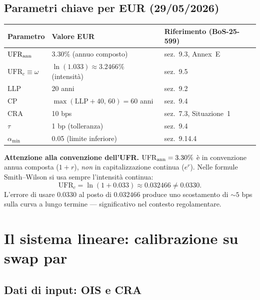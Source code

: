 \documentclass[11pt,a4paper]{article}
\theoremstyle{plain}
\theoremstyle{definition}
\theoremstyle{remark}
\newcommand{\UFR}{\ensuremath{\mathrm{UFR}}}
\newcommand{\LLP}{\ensuremath{\mathrm{LLP}}}
\newcommand{\CP}{\ensuremath{\mathrm{CP}}}
\newcommand{\CRA}{\ensuremath{\mathrm{CRA}}}
\begin{document}
\subsection{Parametri chiave per EUR (29/05/2026)}

\begin{center}
\renewcommand{\arraystretch}{1.25}
\begin{tabular}{lll}
\toprule
\textbf{Parametro} & \textbf{Valore EUR} & \textbf{Riferimento (BoS-25-599)} \\
\midrule
$\UFR_{\rm ann}$ & $3.30\%$ (annuo composto) & sez.~9.3, Annex~E \\
$\UFR_c \equiv \omega$ & $\ln(1.033) \approx 3.2466\%$ (intensità) & sez.~9.5 \\
$\LLP$ & 20 anni & sez.~9.2 \\
$\CP$ & $\max(\LLP+40,\,60) = 60$ anni & sez.~9.4 \\
$\CRA$ & 10 bps & sez.~7.3, Situazione~1 \\
$\tau$ & 1 bp (tolleranza) & sez.~9.4 \\
$\alpha_{\min}$ & 0.05 (limite inferiore) & sez.~9.14.4 \\
\bottomrule
\end{tabular}
\end{center}

\begin{warningbox}
\textbf{Attenzione alla convenzione dell'UFR.}
$\UFR_{\rm ann} = 3.30\%$ \`e in convenzione annua composta ($1+r$), \emph{non}
in capitalizzazione continua ($e^r$). Nelle formule Smith--Wilson si usa
sempre l'intensit\`a continua:
\[
  \UFR_c = \ln(1 + 0.033) \approx 0.032466 \ne 0.0330.
\]
L'errore di usare $0.0330$ al posto di $0.032466$ produce uno scostamento
di $\sim 5$ bps sulla curva a lungo termine --- significativo nel contesto
regolamentare.
\end{warningbox}

\section{Il sistema lineare: calibrazione su swap par}
\label{sec:sistema}

\subsection{Dati di input: OIS e CRA}
\end{document}
